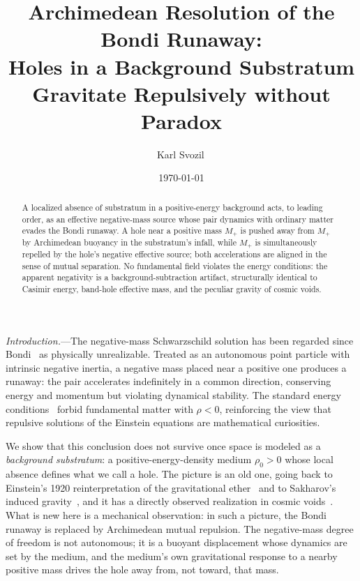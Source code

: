 \documentclass[%
  reprint,
  superscriptaddress,
  amsmath,amssymb,
  prl,
  floatfix,
  x11names
]{revtex4-2}
\begin{document}
\title{Archimedean Resolution of the Bondi Runaway: \\
       Holes in a Background Substratum Gravitate Repulsively without Paradox}

\author{Karl Svozil\,}

\date{\today}

\begin{abstract}
A localized absence of substratum in a positive-energy background acts, to leading order, as an effective negative-mass source whose pair dynamics with ordinary matter evades the Bondi runaway. A hole near a positive mass $M_+$ is pushed away from $M_+$ by Archimedean buoyancy in the substratum's infall, while $M_+$ is simultaneously repelled by the hole's negative effective source; both accelerations are aligned in the sense of mutual separation. No fundamental field violates the energy conditions: the apparent negativity is a background-subtraction artifact, structurally identical to Casimir energy, band-hole effective mass, and the peculiar gravity of cosmic voids.
\end{abstract}

\maketitle

\textit{Introduction.}---The negative-mass Schwarzschild solution has been regarded since Bondi~\cite{bondi-1957} as physically unrealizable. Treated as an autonomous point particle with intrinsic negative inertia, a negative mass placed near a positive one produces a runaway: the pair accelerates indefinitely in a common direction, conserving energy and momentum but violating dynamical stability. The standard energy conditions~\cite{hawking-ellis,wald-1984} forbid fundamental matter with $\rho<0$, reinforcing the view that repulsive solutions of the Einstein equations are mathematical curiosities.

We show that this conclusion does not survive once space is modeled as a \emph{background substratum}: a positive-energy-density medium $\rho_0>0$ whose local absence defines what we call a hole. The picture is an old one, going back to Einstein's 1920 reinterpretation of the gravitational ether~\cite{einstein-aether-en} and to Sakharov's induced gravity~\cite{Sakharov-67}, and it has a directly observed realization in cosmic voids~\cite{shethvdw-2004,hamaus-2014,nadathur-2019}. What is new here is a mechanical observation: in such a picture, the Bondi runaway is replaced by Archimedean mutual repulsion. The negative-mass degree of freedom is not autonomous; it is a buoyant displacement whose dynamics are set by the medium, and the medium's own gravitational response to a nearby positive mass drives the hole away from, not toward, that mass.
\end{document}
